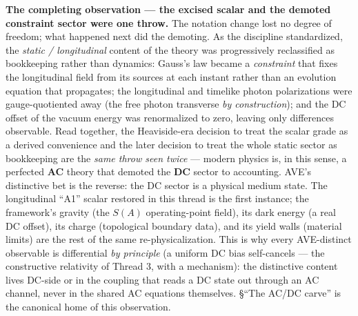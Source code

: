 \vspace{0.5em}
\noindent \textbf{The completing observation --- the excised scalar and the demoted constraint sector were one throw.} The notation change lost no degree of freedom; what happened next did the demoting. As the discipline standardized, the \emph{static / longitudinal} content of the theory was progressively reclassified as bookkeeping rather than dynamics: Gauss's law became a \emph{constraint} that fixes the longitudinal field from its sources at each instant rather than an evolution equation that propagates; the longitudinal and timelike photon polarizations were gauge-quotiented away (the free photon transverse \emph{by construction}); and the DC offset of the vacuum energy was renormalized to zero, leaving only differences observable. Read together, the Heaviside-era decision to treat the scalar grade as a derived convenience and the later decision to treat the whole static sector as bookkeeping are the \emph{same throw seen twice} --- modern physics is, in this sense, a perfected \textbf{AC} theory that demoted the \textbf{DC} sector to accounting. AVE's distinctive bet is the reverse: the DC sector is a physical medium state. The longitudinal ``A1'' scalar restored in this thread is the first instance; the framework's gravity (the $S(A)$ operating-point field), its dark energy (a real DC offset), its charge (topological boundary data), and its yield walls (material limits) are the rest of the same re-physicalization. This is why every AVE-distinct observable is differential \emph{by principle} (a uniform DC bias self-cancels --- the constructive relativity of Thread 3, with a mechanism): the distinctive content lives DC-side or in the coupling that reads a DC state out through an AC channel, never in the shared AC equations themselves.  \S``The AC/DC carve'' is the canonical home of this observation.

